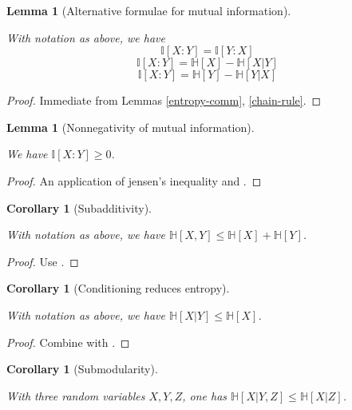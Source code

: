\documentclass[10pt,a4paper]{article}
\newtheorem{lemma}[theorem]{Lemma}
\newtheorem{corollary}[theorem]{Corollary}
\newcommand{\lean}[1]{}
\newcommand{\uses}[1]{}
\newcommand{\leanok}{}
\newcommand{\bbH}{\mathbb{H}}
\newcommand{\bbI}{\mathbb{I}}
\begin{document}
\begin{lemma}[Alternative formulae for mutual information]
  \label{alternative-mutual}
  \uses{information-def}
  \lean{ProbabilityTheory.mutualInfo_comm, ProbabilityTheory.mutualInfo_eq_entropy_sub_condEntropy}
  \leanok
  With notation as above, we have
  $$  \bbI[X : Y] = \bbI[Y:X]$$
  $$  \bbI[X : Y] = \bbH[X] - \bbH[X|Y]$$
  $$  \bbI[X : Y] = \bbH[Y] - \bbH[Y|X]$$
\end{lemma}

\begin{proof}
  \uses{entropy-comm,chain-rule}
  \leanok
  Immediate from Lemmas \ref{entropy-comm}, \ref{chain-rule}.
\end{proof}

\begin{lemma}[Nonnegativity of mutual information]
  \label{mutual-nonneg}
  \lean{ProbabilityTheory.mutualInfo_nonneg}
  \leanok
  We have $\bbI[X:Y] \geq 0$.
\end{lemma}

\begin{proof}
  \uses{concave, alternative-mutual}
  \leanok

  An application of jensen's inequality and .
\end{proof}

\begin{corollary}[Subadditivity]
  \label{subadditive}
  \lean{ProbabilityTheory.entropy_pair_le_add}
  \leanok
  With notation as above, we have $\bbH[X,Y] \leq \bbH[X] + \bbH[Y]$.
\end{corollary}

\begin{proof}
  \uses{mutual-nonneg, alternative-mutual}
  \leanok
  Use .
\end{proof}

\begin{corollary}[Conditioning reduces entropy]
  \label{cond-reduce}
  \lean{ProbabilityTheory.condEntropy_le_entropy}
  \leanok
  With notation as above, we have $\bbH[X|Y] \leq \bbH[X]$.
\end{corollary}
\begin{proof}
  \uses{mutual-nonneg, alternative-mutual}
  \leanok
  Combine  with .
\end{proof}

\begin{corollary}[Submodularity]\label{submodularity}
  \lean{ProbabilityTheory.entropy_submodular, ProbabilityTheory.condEntropy_comp_ge}\leanok
  With three random variables $X,Y,Z$, one has $\bbH[X|Y,Z] \leq \bbH[X|Z]$.
\end{corollary}
\end{document}
